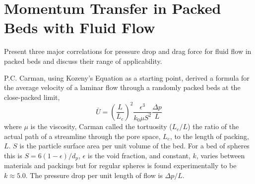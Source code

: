 \FloatBarrier



%
%
\section{Momentum Transfer in Packed Beds with Fluid Flow} \label{sec:modeling-pressure-drop}
Present three major correlations for pressure drop and drag force for fluid flow in packed beds and discuss their range of applicability.








P.C. Carman\cite{Carman1997}, using Kozeny's Equation as a starting point, derived a formula for the average velocity of a laminar flow through a randomly packed beds at the close-packed limit,
\begin{equation}\label{eq:K-C-velocity}
    \bar{U} = \left(\frac{L}{L_e}\right)^2\frac{\epsilon^3}{k_0\mu S^2}\frac{\Delta p}{L}
\end{equation}
where $\mu$ is the viscosity, Carman called the tortuosity ($L_e/L$) the ratio of the actual path of a streamline through the pore space, $L_e$, to the length of packing, $L$. $S$ is the particle surface area per unit volume of the bed. For a bed of spheres this is $S = 6(1-\epsilon)/d_p$, $\epsilon$ is the void fraction, and constant, $k$, varies between materials and packings but for regular spheres is found experimentally to be $k\approx 5.0$. The pressure drop per unit length of flow is $\Delta p/L$.

